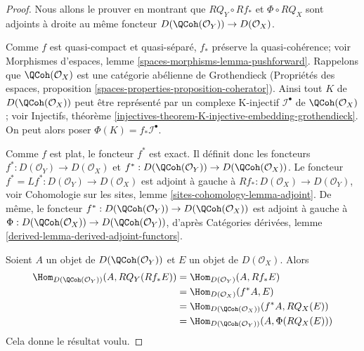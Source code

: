 \begin{proof}
Nous allons le prouver en montrant que $RQ_Y \circ Rf_*$ et
$\Phi \circ RQ_X$ sont adjoints \`a droite au m\^eme foncteur
$D(\QCoh(\mathcal{O}_Y)) \to D(\mathcal{O}_X)$.

\medskip\noindent
Comme $f$ est quasi-compact et quasi-s\'epar\'e, $f_*$ pr\'eserve la
quasi-coh\'erence; voir Morphismes d'espaces, lemme
\ref{spaces-morphisms-lemma-pushforward}. Rappelons que
$\QCoh(\mathcal{O}_X)$ est une cat\'egorie ab\'elienne de Grothendieck
(Propri\'et\'es des espaces, proposition
\ref{spaces-properties-proposition-coherator}).
Ainsi tout $K$ de $D(\QCoh(\mathcal{O}_X))$ peut \^etre repr\'esent\'e par un
complexe K-injectif $\mathcal{I}^\bullet$ de $\QCoh(\mathcal{O}_X)$; voir
Injectifs, th\'eor\`eme
\ref{injectives-theorem-K-injective-embedding-grothendieck}.
On peut alors poser $\Phi(K) = f_*\mathcal{I}^\bullet$.

\medskip\noindent
Comme $f$ est plat, le foncteur $f^*$ est exact. Il d\'efinit donc les
foncteurs
$f^* : D(\mathcal{O}_Y) \to D(\mathcal{O}_X)$ et
$f^* : D(\QCoh(\mathcal{O}_Y)) \to D(\QCoh(\mathcal{O}_X))$.
Le foncteur $f^* = Lf^* : D(\mathcal{O}_Y) \to D(\mathcal{O}_X)$ est adjoint
\`a gauche \`a
$Rf_* : D(\mathcal{O}_X) \to D(\mathcal{O}_Y)$,
voir Cohomologie sur les sites, lemme
\ref{sites-cohomology-lemma-adjoint}. De m\^eme, le foncteur
$f^* : D(\QCoh(\mathcal{O}_Y)) \to D(\QCoh(\mathcal{O}_X))$
est adjoint \`a gauche \`a
$\Phi : D(\QCoh(\mathcal{O}_X)) \to D(\QCoh(\mathcal{O}_Y))$, d'apr\`es
Cat\'egories d\'eriv\'ees, lemme
\ref{derived-lemma-derived-adjoint-functors}.

\medskip\noindent
Soient $A$ un objet de $D(\QCoh(\mathcal{O}_Y))$ et $E$ un objet de
$D(\mathcal{O}_X)$. Alors
\begin{align*}
\Hom_{D(\QCoh(\mathcal{O}_Y))}(A, RQ_Y(Rf_*E))
& =
\Hom_{D(\mathcal{O}_Y)}(A, Rf_*E) \\
& =
\Hom_{D(\mathcal{O}_X)}(f^*A, E) \\
& =
\Hom_{D(\QCoh(\mathcal{O}_X))}(f^*A, RQ_X(E)) \\
& =
\Hom_{D(\QCoh(\mathcal{O}_Y))}(A, \Phi(RQ_X(E)))
\end{align*}
Cela donne le r\'esultat voulu.
\end{proof}

